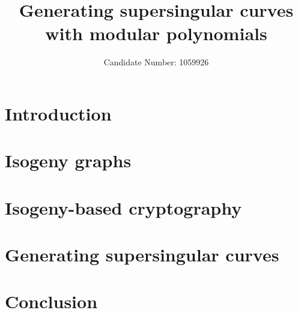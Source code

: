 \documentclass{ociamthesis}
\title{Generating supersingular curves with modular polynomials}
\author{Candidate Number: 1059926}
\theoremstyle{definition}
\begin{document}
\maketitle




\begin{romanpages}
    \tableofcontents
\end{romanpages}

\chapter{Introduction}



\chapter{Isogeny graphs}



\chapter{Isogeny-based cryptography}



\chapter{Generating supersingular curves}



\chapter{Conclusion}



\printbibliography
\end{document}

